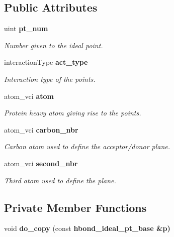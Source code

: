 \subsection*{Public Attributes}
\begin{CompactItemize}
\item 
uint \bf{pt\_\-num}\label{classASCbase_1_1hbond__ideal__pt__base_a6829823658e609726d64d46f05a53c4}

\begin{CompactList}\small\item\em Number given to the ideal point. \item\end{CompactList}\item 
interaction\-Type \bf{act\_\-type}\label{classASCbase_1_1hbond__ideal__pt__base_2b226c040314c92bf0e9d0e647f66897}

\begin{CompactList}\small\item\em Interaction type of the points. \item\end{CompactList}\item 
atom\_\-vci \bf{atom}\label{classASCbase_1_1hbond__ideal__pt__base_c69850f24c46ac0c32143cf6f3ac2c91}

\begin{CompactList}\small\item\em Protein heavy atom giving rise to the points. \item\end{CompactList}\item 
atom\_\-vci \bf{carbon\_\-nbr}\label{classASCbase_1_1hbond__ideal__pt__base_7155ffb9e0c06bc4267fb4ee28b9d212}

\begin{CompactList}\small\item\em Carbon atom used to define the acceptor/donor plane. \item\end{CompactList}\item 
atom\_\-vci \bf{second\_\-nbr}\label{classASCbase_1_1hbond__ideal__pt__base_733afddb617c0b55f4887e963d954848}

\begin{CompactList}\small\item\em Third atom used to define the plane. \item\end{CompactList}\end{CompactItemize}
\subsection*{Private Member Functions}
\begin{CompactItemize}
\item 
void \textbf{do\_\-copy} (const \bf{hbond\_\-ideal\_\-pt\_\-base} \&p)\label{classASCbase_1_1hbond__ideal__pt__base_ea14650cc4989d996bb228f2d68e2cee}

\end{CompactItemize}


